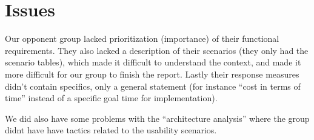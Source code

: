 
\section{Issues}
\label{sec:issues}
Our opponent group lacked prioritization (importance) of their functional
requirements. They also lacked a description of their scenarios (they only had
the scenario tables), which made it difficult to understand the context, and
made it more difficult for our group to finish the report. Lastly their
response measures didn't contain specifics, only a general statement (for
instance ``cost in terms of time'' instead of a specific goal time for
implementation).

We did also have some problems with the ``architecture analysis'' where the
group didnt have have tactics related to the usability scenarios.
